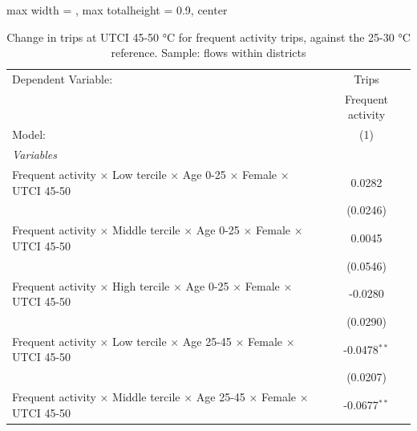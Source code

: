 
\begin{table}[htbp]
   \caption{\label{table_intersectionality_frequent_activity_45-50} Change in trips at UTCI 45-50 °C for frequent activity trips, against the 25-30 °C reference. Sample: flows within districts}
   \centering
   \small
   \begin{adjustbox}{max width = \textwidth, max totalheight = 0.9\textheight, center}
      \begin{tabular}{lc}
         \tabularnewline \midrule \midrule
         Dependent Variable:                                                                                   & Trips\\  
                                                                                                               & Frequent activity \\   
         Model:                                                                                                & (1)\\  
         \midrule
         \emph{Variables}\\
         Frequent activity $\times$ Low tercile $\times$ Age 0-25 $\times$ Female $\times$ UTCI 45-50          & 0.0282\\   
                                                                                                               & (0.0246)\\   
         Frequent activity $\times$ Middle tercile $\times$ Age 0-25 $\times$ Female $\times$ UTCI 45-50       & 0.0045\\   
                                                                                                               & (0.0546)\\   
         Frequent activity $\times$ High tercile $\times$ Age 0-25 $\times$ Female $\times$ UTCI 45-50         & -0.0280\\   
                                                                                                               & (0.0290)\\   
         Frequent activity $\times$ Low tercile $\times$ Age 25-45 $\times$ Female $\times$ UTCI 45-50         & -0.0478$^{**}$\\   
                                                                                                               & (0.0207)\\   
         Frequent activity $\times$ Middle tercile $\times$ Age 25-45 $\times$ Female $\times$ UTCI 45-50      & -0.0677$^{**}$\\   

\end{tabular}
\end{adjustbox}
\end{table}
